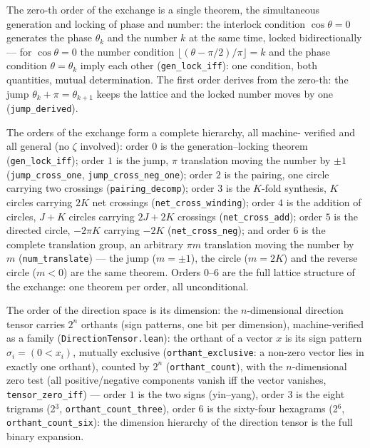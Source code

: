\documentclass{article}
\newcommand{\zt}{\zeta}
\begin{document}
The zero-th order of the exchange is a single theorem, the
simultaneous generation and locking of phase and number: the
interlock condition $\cos\theta=0$ generates the phase $\theta_k$ and
the number $k$ at the same time, locked bidirectionally --- for
$\cos\theta=0$ the number condition $\lfloor(\theta-\pi/2)/\pi\rfloor=k$
and the phase condition $\theta=\theta_k$ imply each other
(\texttt{gen\_lock\_iff}): one condition, both quantities, mutual
determination. The first order derives from the zero-th: the jump
$\theta_k+\pi=\theta_{k+1}$ keeps the lattice and the locked number
moves by one (\texttt{jump\_derived}).

The orders of the exchange form a complete hierarchy, all machine-
verified and all general (no $\zt$ involved): order $0$ is the
generation--locking theorem (\texttt{gen\_lock\_iff}); order $1$ is
the jump, $\pi$ translation moving the number by $\pm1$
(\texttt{jump\_cross\_one}, \texttt{jump\_cross\_neg\_one}); order
$2$ is the pairing, one circle carrying two crossings
(\texttt{pairing\_decomp}); order $3$ is the $K$-fold synthesis, $K$
circles carrying $2K$ net crossings (\texttt{net\_cross\_winding});
order $4$ is the addition of circles, $J+K$ circles carrying
$2J+2K$ crossings (\texttt{net\_cross\_add}); order $5$ is the
directed circle, $-2\pi K$ carrying $-2K$ (\texttt{net\_cross\_neg});
and order $6$ is the complete translation group, an arbitrary
$\pi m$ translation moving the number by $m$
(\texttt{num\_translate}) --- the jump ($m=\pm1$), the circle
($m=2K$) and the reverse circle ($m<0$) are the same theorem.
Orders $0$--$6$ are the full lattice structure of the exchange: one
theorem per order, all unconditional.

The order of the direction space is its dimension: the $n$-dimensional
direction tensor carries $2^n$ orthants (sign patterns, one bit per
dimension), machine-verified as a family
(\texttt{DirectionTensor.lean}): the orthant of a vector $x$ is its
sign pattern $\sigma_i = (0<x_i)$, mutually exclusive
(\texttt{orthant\_exclusive}: a non-zero vector lies in exactly one
orthant), counted by $2^n$ (\texttt{orthant\_count}), with the
$n$-dimensional zero test (all positive/negative components vanish
iff the vector vanishes, \texttt{tensor\_zero\_iff}) --- order $1$
is the two signs (yin--yang), order $3$ is the eight trigrams
(2$^3$, \texttt{orthant\_count\_three}), order $6$ is the sixty-four
hexagrams (2$^6$, \texttt{orthant\_count\_six}): the dimension
hierarchy of the direction tensor is the full binary expansion.
\end{document}
